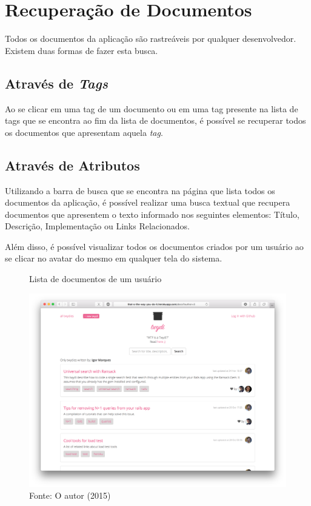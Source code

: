\section{Recuperação de Documentos}

Todos os documentos da aplicação são rastreáveis por qualquer desenvolvedor. Existem duas formas de fazer esta busca.

\subsection{Através de \textit{Tags}}

Ao se clicar em uma tag de um documento ou em uma tag presente na lista de tags que se encontra ao fim da lista de documentos, é possível se recuperar todos os documentos que apresentam aquela \textit{tag}.

\subsection{Através de Atributos}

Utilizando a barra de busca que se encontra na página que lista todos os documentos da aplicação, é possível realizar uma busca textual que recupera documentos que apresentem o texto informado nos seguintes elementos: Título, Descrição, Implementação ou Links Relacionados.

Além disso, é possível visualizar todos os documentos criados por um usuário ao se clicar no avatar do mesmo em qualquer tela do sistema.

\begin{figure}[h]
	\centering
    \caption{Lista de documentos de um usuário}
    \includegraphics[width=15cm]{Imagens/print-by-user.png}
	\caption*{Fonte: O autor (2015)}
\end{figure}

